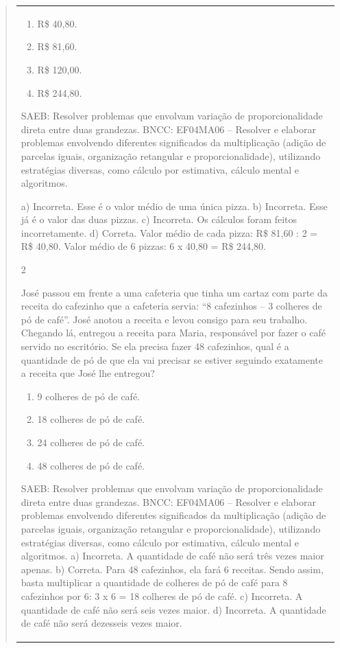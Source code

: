 \begin{mdframed}[linewidth=2pt,linecolor=salmao,roundcorner=2pt]
\begin{itemize}
{\begin{itemize}
\begin{escolha}
{\begin{quote}
{\begin{escolha}
{{{{{\begin{longtable}[]{@{}l@{}}
\begin{itemize}
\begin{enumerate}
\item
  R\$ 40,80.
\item
  R\$ 81,60.
\item
  R\$ 120,00.
\item
  R\$ 244,80.
\end{enumerate}

SAEB: Resolver problemas que envolvam variação de proporcionalidade direta entre duas grandezas.
BNCC: EF04MA06 -- Resolver e elaborar problemas envolvendo diferentes significados da multiplicação
(adição de parcelas iguais, organização retangular e proporcionalidade), utilizando estratégias
diversas, como cálculo por estimativa, cálculo mental e algoritmos.

a)  Incorreta. Esse é o valor médio de uma única pizza.
b)  Incorreta. Esse já é o valor das duas pizzas.
c)  Incorreta. Os cálculos foram feitos incorretamente.
d)  Correta.  Valor médio de cada pizza: R\$ 81,60 : 2 = R\$ 40,80. Valor médio de 6 pizzas: 6 x 40,80 = R\$ 244,80.


\num{2}

José passou em frente a uma cafeteria que tinha um cartaz com parte da
receita do cafezinho que a cafeteria servia: ``8 cafezinhos -- 3 colheres de pó de café''.
José anotou a receita e levou consigo para seu trabalho. Chegando lá,
entregou a receita para Maria, responsável por fazer o café servido no
escritório. Se ela precisa fazer 48 cafezinhos, qual é a
quantidade de pó de que ela vai precisar se estiver seguindo exatamente a
receita que José lhe entregou?

\begin{enumerate}
\item
  9 colheres de pó de café.
\item
  18 colheres de pó de café.
\item
  24 colheres de pó de café.
\item
  48 colheres de pó de café.
\end{enumerate}

SAEB: Resolver problemas que envolvam variação de proporcionalidade direta entre duas grandezas.
BNCC: EF04MA06 -- Resolver e elaborar problemas envolvendo diferentes significados da multiplicação
(adição de parcelas iguais, organização retangular e proporcionalidade), utilizando estratégias
diversas, como cálculo por estimativa, cálculo mental e algoritmos.
a) Incorreta. A quantidade de café não será três vezes maior apenas.
b) Correta. Para 48 cafezinhos, ela fará 6 receitas. Sendo assim, basta
multiplicar a quantidade de colheres de pó de café para 8 cafezinhos por
6: 3 x 6 = 18 colheres de pó de café.
c) Incorreta. A quantidade de café não será seis vezes maior.
d) Incorreta. A quantidade de café não será dezesseis vezes maior.


\end{itemize}
\end{longtable}}}}}}
\end{escolha}}
\end{quote}}
\end{escolha}
\end{itemize}}
\end{itemize}
\end{mdframed}
